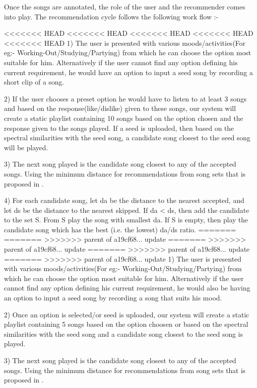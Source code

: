 \documentclass{article}
\begin{document}
Once the songs are annotated, the role of the user and the recommender comes into play. The recommendation cycle follows the following work flow :-


<<<<<<< HEAD
<<<<<<< HEAD
<<<<<<< HEAD
<<<<<<< HEAD
<<<<<<< HEAD
1) The user is presented with various moods/activities(For eg:- Working-Out/Studying/Partying) from which he can choose the option most suitable for him. Alternatively if the user cannot find any option defining his current requirement, he would have an option to input a seed song by recording a short clip of a song.

2) If the user chooses a preset option he would have to listen to at least 3 songs and based on the response(like/dislike) given to these songs, our system will create a static playlist containing 10 songs based on the option chosen and the response given to the songs played. If a seed is uploaded, then based on the spectral similarities with the seed song, a candidate song closest to the seed song will be played.

3) The next song played is the candidate song closest to any of the accepted songs. Using the minimum distance for recommendations from song sets that is proposed in \cite{Logan04musicrecommendation}.

4) For each candidate song, let da be the distance to the nearest accepted, and let ds be the distance to the nearest skipped. If da < ds, then add the candidate to the set S. From S play the song with smallest da. If S is empty, then play the candidate song which has the best (i.e. the lowest) da/ds ratio.\cite{Tim05dynamicplaylist}
=======
=======
>>>>>>> parent of a19cf68... update
=======
>>>>>>> parent of a19cf68... update
=======
>>>>>>> parent of a19cf68... update
=======
>>>>>>> parent of a19cf68... update
1) The user is presented with various moods/activities(For eg:- Working-Out/Studying/Partying) from which he can choose the option most suitable for him. Alternatively if the user cannot find any option defining his current requirement, he would also be having an option to input a seed song by recording a song that suits his mood.

2) Once an option is selected/or seed is uploaded, our system will create a static playlist containing 5 songs based on the option choosen or based on the spectral similarities with the seed song and a candidate song closest to the seed song is played.

3) The next song played is the candidate song closest to any of the accepted songs. Using the minimum distance for recommendations from song sets that is proposed in \cite{Logan04musicrecommendation}.
\end{document}
